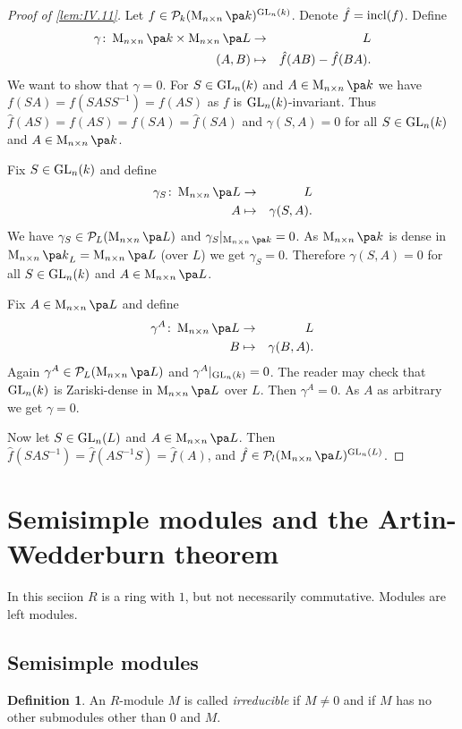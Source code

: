 \documentclass[12pt,a4paper]{scrartcl}
\theoremstyle{cplain}
\theoremstyle{cplain}
\theoremstyle{cplain}
\theoremstyle{definition}
\newtheorem*{deff}{Definition}
\begin{document}
\begin{otherlanguage}{english}
\begin{proof}[Proof of \cref{lem:IV.11}]
  Let $f\in\Ps_k(\Mat nk)^{\GL_n(k)}$. Denote $\hat f = \operatorname{incl}(f)$. Define
  \begin{eqnarray*}
    \gamma\colon \Mat nk \times \Mat nL &\to& L \\
    (A,B) &\mapsto& \hat f (AB) - \hat f(BA). %
  \end{eqnarray*}
  We want to show that $\gamma = 0$. For $S \in \operatorname{GL}_n(k)$ and $A\in\Mat nk$ we have $f(SA) = f(SASS^{-1}) = f(AS)$ as $f$ is $\operatorname{GL}_n(k)$-invariant. Thus $\hat f(AS) = f(AS) = f(SA) =\hat f(SA)$ and $\gamma(S,A) = 0$ for all $S \in \operatorname{GL}_n(k)$ and $A \in \Mat nk$.
  
  Fix $S \in \operatorname{GL}_n(k)$ and define
  \begin{eqnarray*}
    \gamma_S\colon \Mat nL &\to& L \\
    A &\mapsto& \gamma(S,A).
  \end{eqnarray*}
  We have $\gamma_S \in \Ps_L(\Mat nL)$ and $\gamma_S|_{\Mat nk} = 0$. As $\Mat nk$ is dense in ${\Mat nk}_L = \Mat nL$ (over $L$) we get $\gamma_S = 0$. Therefore $\gamma(S,A) = 0$ for all $S \in \operatorname{GL}_n(k)$ and $A \in \Mat nL$.
  
  Fix $A \in \Mat nL$ and define
  \begin{eqnarray*}
    \gamma^A\colon \Mat nL &\to& L \\
    B &\mapsto& \gamma(B,A).
  \end{eqnarray*}
  Again $\gamma^A\in \Ps_L(\Mat nL)$ and $\gamma^A|_{\operatorname{GL}_n(k)} = 0$. The reader may check that $\operatorname{GL}_n(k)$ is Zariski-dense in $\Mat nL$ over $L$. Then $\gamma^A = 0$. As $A$ as arbitrary we get $\gamma = 0$.
  
  Now let $S \in \operatorname{GL}_n(L)$ and $A\in\Mat nL$. Then $\hat f(SAS^{-1}) = \hat f (AS^{-1}S) = \hat f (A)$, and $\hat f \in\Ps_l(\Mat nL)^{\GL_n(L)}$.
\end{proof}

\section{Semisimple modules and the Artin-Wedderburn theorem}
In this seciion $R$ is a ring with $1$, but not necessarily commutative. Modules are left modules.

\subsection{Semisimple modules}
\begin{deff}
  An $R$-module $M$ is called \emph{irreducible} if $M\neq 0$ and if $M$ has no other submodules other than $0$ and $M$.
\end{deff}


\end{otherlanguage}
\end{document}
